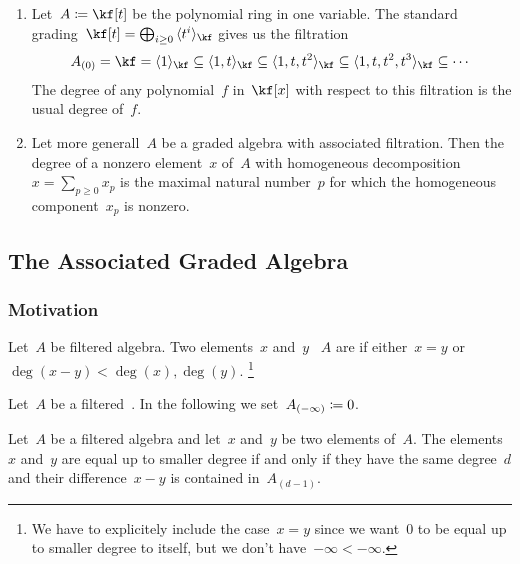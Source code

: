 \begin{example}
	\leavevmode
	\begin{enumerate}
		\item
			Let~$A \defined \kf[t]$ be the polynomial ring in one variable.
			The standard grading~$\kf[t] = \bigoplus_{i \geq 0} {} \gen{ t^i }_{\kf}$ gives us the filtration
			\[
				A_{(0)}
				=
				\kf
				=
				\gen{ 1 }_{\kf}
				\subseteq
				\gen{ 1, t }_{\kf}
				\subseteq
				\gen{ 1, t, t^2 }_{\kf}
				\subseteq
				\gen{ 1, t, t^2, t^3 }_{\kf}
				\subseteq
				\dotsb
			\]
			The degree of any polynomial~$f$ in~$\kf[x]$ with respect to this filtration is the usual degree of~$f$.
		\item
			Let more generall~$A$ be a graded algebra with associated filtration.
			Then the degree of a nonzero element~$x$ of~$A$ with homogeneous decomposition~$x = \sum_{p \geq 0} x_p$ is the maximal natural number~$p$ for which the homogeneous component~$x_p$ is nonzero.
	\end{enumerate}
\end{example}



\subsection{The Associated Graded Algebra}

\subsubsection{Motivation}

\begin{definition}
	Let~$A$ be filtered algebra.
	Two elements~$x$ and~$y$ ~$A$ are  if either~$x = y$ or~$\deg(x-y) < \deg(x), \deg(y)$.%
	\footnote{
		We have to explicitely include the case~$x = y$ since we want~$0$ to be equal up to smaller degree to itself, but we don’t have~$-\infty < -\infty$.
	}
\end{definition}


\begin{convention}
	Let~$A$ be a filtered~\algebra{$\kf$}.
	In the following we set~$A_{(-\infty)} \coloneqq 0$.
\end{convention}


\begin{proposition}
	Let~$A$ be a filtered algebra and let~$x$ and~$y$ be two elements of~$A$.
	The elements~$x$ and~$y$ are equal up to smaller degree if and only if they have the same degree~$d$ and their difference~$x - y$ is contained in~$A_{(d-1)}$.%
\end{proposition}



